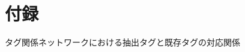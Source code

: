 \chapter*{付録}
\label{chap:appendix}
\fancyhf{}
\rhead{\thepage}
\cfoot{\thepage}


タグ関係ネットワークにおける抽出タグと既存タグの対応関係


%
%

